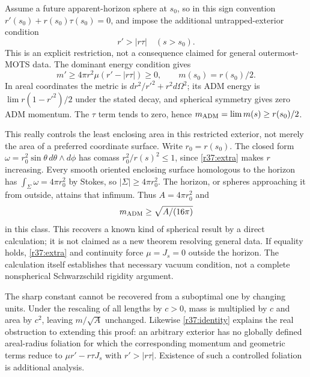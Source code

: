 \documentclass[11pt,a4paper]{article}
\numberwithin{equation}{section}
\begin{document}
Assume a future apparent-horizon sphere at $s_0$, so in this sign convention
$r'(s_0)+r(s_0)\tau(s_0)=0$, and impose the additional untrapped-exterior
condition
\begin{equation}\label{r37:extra}
 r'>|r\tau|\quad(s>s_0).
\end{equation}
This is an explicit restriction, not a consequence claimed for general
outermost-MOTS data. The dominant energy condition gives
\[
 m'\ge4\pi r^2\mu(r'-|r\tau|)\ge0,
 \qquad m(s_0)=r(s_0)/2.
\]
In areal coordinates the metric is $dr^2/r'^2+r^2d\Omega^2$; its ADM energy
is $\lim r(1-r'^2)/2$ under the stated decay, and spherical symmetry gives
zero ADM momentum. The $\tau$ term tends to zero, hence
$m_{\rm ADM}=\lim m(s)\ge r(s_0)/2$.

This really controls the least enclosing area in this restricted exterior,
not merely the area of a preferred coordinate surface. Write $r_0=r(s_0)$.
The closed form $\omega=r_0^2\sin\theta\,d\theta\wedge d\phi$ has comass
$r_0^2/r(s)^2\le1$, since \eqref{r37:extra} makes $r$ increasing. Every smooth
oriented enclosing surface homologous to the horizon has
$\int_\Sigma\omega=4\pi r_0^2$ by Stokes, so
$|\Sigma|\ge4\pi r_0^2$. The horizon, or spheres approaching it from outside,
attains that infimum. Thus $A=4\pi r_0^2$ and
\[
 m_{\rm ADM}\ge\sqrt{A/(16\pi)}
\]
in this class. This recovers a known kind of spherical result by a direct
calculation; it is not claimed as a new theorem resolving general data.
If equality holds, \eqref{r37:extra} and continuity force $\mu=J_s=0$ outside
the horizon. The calculation itself establishes that necessary vacuum
condition, not a complete nonspherical Schwarzschild rigidity argument.

The sharp constant cannot be recovered from a suboptimal one by changing
units. Under the rescaling of all lengths by $c>0$, mass is multiplied by $c$
and area by $c^2$, leaving $m/\sqrt A$ unchanged. Likewise \eqref{r37:identity}
explains the real obstruction to extending this proof: an arbitrary exterior
has no globally defined areal-radius foliation for which the corresponding
momentum and geometric terms reduce to $\mu r'-r\tau J_s$ with
$r'>|r\tau|$. Existence of such a controlled foliation is additional analysis.
\end{document}
